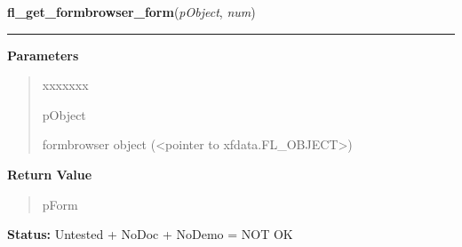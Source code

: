 \hspace{.8\funcindent}\begin{boxedminipage}{\funcwidth}

    \raggedright \textbf{fl\_get\_formbrowser\_form}(\textit{pObject}, \textit{num})

    \vspace{-1.5ex}

    \rule{\textwidth}{0.5\fboxrule}
\setlength{\parskip}{2ex}
\setlength{\parskip}{1ex}
      \textbf{Parameters}
      \vspace{-1ex}

      \begin{quote}
        \begin{Ventry}{xxxxxxx}

          \item[pObject]

          formbrowser object ({\textless}pointer to 
          xfdata.FL\_OBJECT{\textgreater})

        \end{Ventry}

      \end{quote}

      \textbf{Return Value}
    \vspace{-1ex}

      \begin{quote}
      pForm

      \end{quote}

\textbf{Status:} Untested + NoDoc + NoDemo = NOT OK



    \end{boxedminipage}

    \label{xformslib:library:fl_add_frame}

    \vspace{0.5ex}

